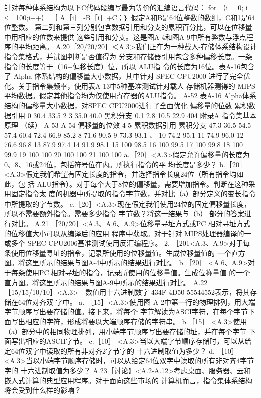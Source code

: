 针对每种体系结构为以下C代码段编写最为等价的汇编语言代码：
for （i = 0; i ≤= 100;i++）
｛ A［i］ -B［i］+C；｝
假定A和B是64位整数的数组，C和1是64位整数。
第二列和第三列分别包含数据引用和分支的累积百分比，可以在位移量中用相应的位数来提供
这些引用和分支。这是图A-4和图A-9中所有弊数与浮点程序的平均距离。
A.20［20/20/20］＜A.3>我们正在为一种载人-存储体系结构设计指令集格式，并试图判断是否值得为
分支和存储器引用包含多种偏移长度。一条指令的长度等于（16+偏移长度）位，所以 ALU指
令的长度为16位。表A-16包含了 Alpha 体系结构的偏移量大小数据，其中针对 SPEC CPU2000
进行了完全优化。关于指令集频率，使用表A-13中5种基准测试针对载人-存储机器测得的
MIPS 平均数据。假定其他指令均为仅使用寄存器的ALU措令。
A-52
表A-16 Alpha体系结构的偏移量大小数据，对SPEC CPU2000进行了全面优化
偏移量的位数
累积数据引用
0
30.4%
33.5%
2
3
35.0%
40.0%
黑积分支
0.1%
2.8%
10.5%
22.9%
404
附录A 指令集基本原理
（续）
A-53
A-54
偏移量的位效
4
5
累积数据引用
累积分支
47.3%
36.5%
54.5%
57.4%
60.4%
72.4%
66.9%
85.2%
8
71.6%
90.5%
9
73.3%
93.1%
、
10
74.2%
95.1%
11
74.9%
96.0%
12
76.6%
96.8%
13
87.9%
97.4%
14
91.9%
98.1%
15
100%
98.5%
16
100%
99.5%
17
100%
99.8%
18
100%
99.9%
19
100%
100%
20
100%
100%
21
100%
100%
a.［20］<A.3>假定允许偏移量的长度为0、8、16或24位，包括符号位在内。所执行指令的平
均长度是多少？
b.［20］<A.3>假定我们希望有固定长度的指令，并选择指令长度24位（所有指令均如此，包
括 ALU指令）。对于每个大于8位的偏移量，需要增加指令。判断在这种采用固定指令太
度的机器中所提取的指令字节数，并对比（a）部分定义的变长指令中所提取的字节数。
c.［20］<A.3>现在假定我们使用24位的固定偏移量长度，所以不需要额外指令。需要多少指令
字节数？将这一结果与（b） 部分的答案进行对比。
A.21 ［20/20］<A.3、A.6、A.9>位移量寻址方式或PC 相对寻址方式的位移值大小可以从编译后的应用
程序中获取。对于针对 MIPS处理器编译的一或多个 SPEC CPU2006基准测试使用反汇编程序。
2. ［201<A.3、A.9>对于每条使用位移量寻址的指令，记录所使用的位移量值。生成位移量值的
一个直方图。将这里所示的结果与图A-4中所示的结果进行对比。
b.［20］ <A.6、A.9>对于每条使用PC.相对寻址的指令，记录所使用的位移量值。生成位称量值
的一个直方图。将这里所示的结果与图A-9中所示的结果进行对比。
A.22 ［15/15/10/10］<A.3>—数值用十六进制数字 434F 4D50 55544552表示，将其存储在64位对齐双
字中。
a. ［15］<A.3>使用图 A-2中第一行的物理排列，用大端字节顺序写出要存储的值。接下来，将每个
字节解读为ASCI字符，在每个字节下面写出相应的字符，形成将要以大端顺序存储的字符串。
b.［15］ <A.3>使用（a）部分中的相同物理排列，用小端字节顺序写出要存储的址，并在每个字节
下面写出相应的ASCII字节。
c.［10］ <A.3>当以大端字节顺序存储时，可以从给定64位双字中读取的所有非对齐2字节字的
十六进制取值为多少？
d. ［10］ <A.3>当以小端字节顺序存储时，可以从给定64位双字中读取的所有非对齐4字节字的
十六进制取值为多少？
A.23［讨论】<A.2-A.12>考虑桌面、服务器、云和嵌人式计算的典型应用程序。对于面向这些市场的
计算机而言，指令集体系结构将会受到什么样的影响？